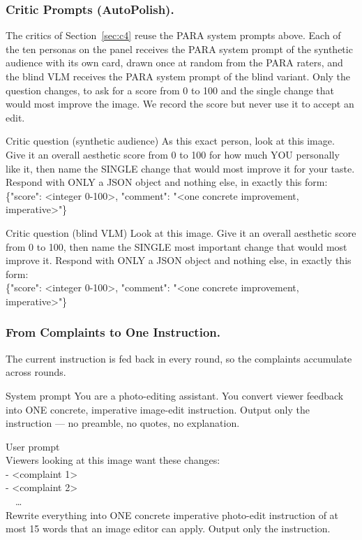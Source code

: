 \documentclass[runningheads]{llncs}
\begin{document}
\subsubsection{Critic Prompts (AutoPolish).} The critics of Section~\ref{sec:c4} reuse the PARA system prompts above. Each of the ten personas on the panel receives the PARA system prompt of the synthetic audience with its own card, drawn once at random from the PARA raters, and the blind VLM receives the PARA system prompt of the blind variant. Only the question changes, to ask for a score from 0 to 100 and the single change that would most improve the image. We record the score but never use it to accept an edit.
\begin{promptbox}{Critic question (synthetic audience)}
\ttfamily
As this exact person, look at this image. Give it an overall aesthetic score from 0 to 100 for how much YOU personally like it, then name the SINGLE change that would most improve it for your taste. Respond with ONLY a JSON object and nothing else, in exactly this form:\\[2pt]
\{"score": <integer 0-100>, "comment": "<one concrete improvement, imperative>"\}
\end{promptbox}
\begin{promptbox}{Critic question (blind VLM)}
\ttfamily
Look at this image. Give it an overall aesthetic score from 0 to 100, then name the SINGLE most important change that would most improve it. Respond with ONLY a JSON object and nothing else, in exactly this form:\\[2pt]
\{"score": <integer 0-100>, "comment": "<one concrete improvement, imperative>"\}
\end{promptbox}

\subsubsection{From Complaints to One Instruction.} The current instruction is fed back in every round, so the complaints accumulate across rounds.
\begin{promptbox}{System prompt}
\ttfamily
You are a photo-editing assistant. You convert viewer feedback into ONE concrete, imperative image-edit instruction. Output only the instruction — no preamble, no quotes, no explanation.
\end{promptbox}
\begin{promptbox}{User prompt}
\\[2pt]
Viewers looking at this image want these changes:\\
- <complaint 1>\\
- <complaint 2>\\
\ \ \dots\\[2pt]
Rewrite everything into ONE concrete imperative photo-edit instruction of at most 15 words that an image editor can apply. Output only the instruction.
\end{promptbox}
\end{document}
